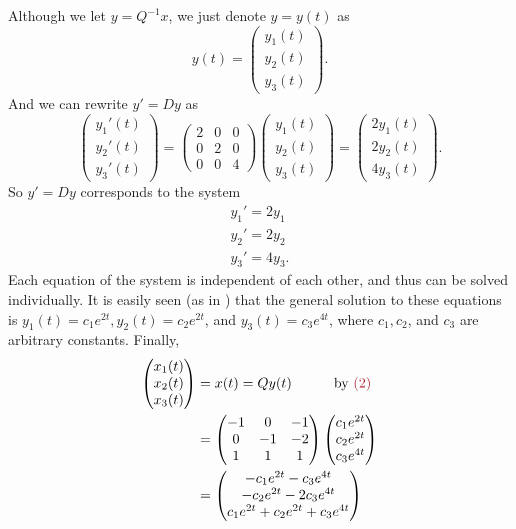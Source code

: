 Although we let \(y = Q^{-1}x\), we just denote \(y = y(t)\) as
\[
    y(t) = \begin{pmatrix}
        y_1(t) \\ y_2(t) \\ y_3(t)
    \end{pmatrix}.
\]
And we can rewrite \(y' = Dy\) as
\[
    \begin{pmatrix}
        y_1'(t) \\ y_2'(t) \\ y_3'(t)
    \end{pmatrix}
    = \begin{pmatrix}
        2 & 0 & 0 \\ 0 & 2 & 0 \\ 0 & 0 & 4
    \end{pmatrix}
    \begin{pmatrix}
        y_1(t) \\ y_2(t) \\ y_3(t)
    \end{pmatrix}
    = \begin{pmatrix}
        2y_1(t) \\ 2y_2(t) \\ 4y_3(t)
    \end{pmatrix}.
\]
So \(y' = Dy\) corresponds to the system
\begin{align*}
    y_1' = 2y_1 \\
    y_2' = 2y_2 \\
    y_3' = 4y_3.
\end{align*}
Each equation of the system is independent of each other, and thus can be solved individually.
It is easily seen (as in ) that the general solution to these equations is \(y_1(t) = c_1e^{2t}, y_2(t) = c_2e^{2t}\), and \(y_3(t) = c_3e^{4t}\),
where \(c_1, c_2\), and \(c_3\) are arbitrary constants.
Finally,
\begin{align*}
    \begin{pmatrix} x_{1}(t) \\ x_{2}(t) \\ x_{3}(t)     \end{pmatrix}
    & = x(t) = Q y(t) \quad \quad \quad \text{by \MAROON{(2)}} \\
    & = \begin{pmatrix} -1 & 0 & -1 \\ 0 & -1 & -2 \\ 1 & 1 & 1 \end{pmatrix}
    \begin{pmatrix} c_{1} e^{2 t} \\ c_{2} e^{2 t} \\ c_{3} e^{4 t} \end{pmatrix} \\
    & = \begin{pmatrix}
        -c_{1} e^{2 t}-c_{3} e^{4 t} \\
        -c_{2} e^{2 t} - 2 c_3 e^{4 t} \\
        c_{1} e^{2 t}+c_{2} e^{2 t} + c_{3} e^{4 t} \\
    \end{pmatrix}
\end{align*}

